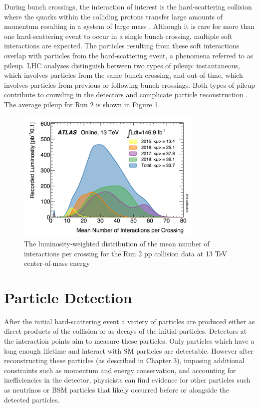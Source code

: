 During bunch crossings, the interaction of interest is the hard-scattering collision where the quarks within the colliding protons transfer large amounts of momentum resulting in a system of large mass \cite{hard_scattering}. Although it is rare for more than one hard-scattering event to occur in a single bunch crossing, multiple soft interactions are expected. The particles resulting from these soft interactions overlap with particles from the hard-scattering event, a phenomena referred to as pileup. LHC analyses distinguish between two types of pileup: instantaneous, which involves particles from the same bunch crossing, and out-of-time, which involves particles from previous or following bunch crossings. Both types of pileup contribute to crowding in the detectors and complicate particle reconstruction \cite{pileup}. The average pileup for Run 2 is shown in Figure \ref{fig:pu}.\\

\begin{figure}[h]
    \centering
    \includegraphics[width=3.5in]{figures/chapter2/run2_pu.pdf}
    \caption{The luminosity-weighted distribution of the mean number of interactions per crossing for the Run 2 pp collision data at 13 TeV center-of-mass energy \cite{run2_lumi}}
    \label{fig:pu}
\end{figure}


\section{Particle Detection}

After the initial hard-scattering event a variety of particles are produced either as direct products of the collision or as decays of the initial particles. Detectors at the interaction points aim to measure these particles. Only particles which have a long enough lifetime and interact with SM particles are detectable. However after reconstructing these particles (as described in Chapter 3), imposing additional constraints such as momentum and energy conservation, and accounting for inefficiencies in the detector, physicists can find evidence for other particles such as neutrinos or BSM particles that likely occurred before or alongside the detected particles.\\

